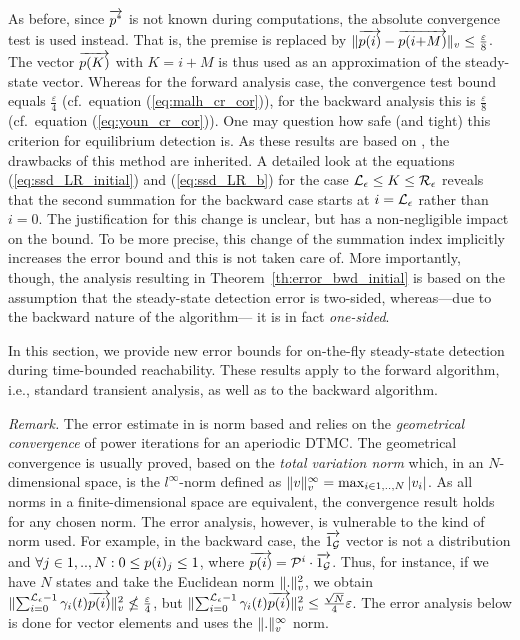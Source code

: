 \documentclass[times, 10pt,twocolumn]{article}
\begin{document}
		As before, since $\overrightarrow{p^{*}}$ is not known during computations, the absolute convergence test is used instead. That is, the premise is replaced by  $\lVert \overrightarrow{p(i)} - \overrightarrow{p(i{+}M)} \rVert_{v} \leq \frac{\varepsilon}{8}$.
		The vector $\overrightarrow{p(K)}$ with $K=i{+}M$ is thus used as an approximation of the steady-state vector. Whereas for the forward analysis case, the convergence test bound equals $\frac{\varepsilon}{4}$ (cf.\ equation (\ref{eq:malh_cr_cor})), for the backward analysis this is $\frac{\varepsilon}{8}$  (cf.\ equation (\ref{eq:youn_cr_cor})).  One may question how safe (and tight) this criterion for equilibrium detection is.  As these results are based on \cite{MalhotraMT_MR94}, the drawbacks of this method are inherited.  A detailed look at the equations (\ref{eq:ssd_LR_initial}) and (\ref{eq:ssd_LR_b}) for the case $\mathcal{L}_{\epsilon} \leq K \leq \mathcal{R}_{\epsilon}$ reveals that the second summation for the backward case starts at $i=\mathcal{L}_{\epsilon}$ rather than $i=0$.  The justification for this change is unclear, but has a non-negligible impact on the bound. To be more precise, this change of the summation index implicitly increases the error bound and this is not taken care of. More importantly, though,  the analysis resulting in Theorem~\ref{th:error_bwd_initial} is based on the assumption that the steady-state detection error is two-sided, whereas---due to the backward nature of the algorithm--- it is in fact \emph{one-sided}.

{}

	In this section, we provide new error bounds for on-the-fly steady-state detection during time-bounded reachability.  These results apply to the forward algorithm, i.e., standard transient analysis, as well as to the backward algorithm. %

	\emph{Remark.} The error estimate in \cite{MalhotraMT_MR94} is norm based and relies on the \emph{geometrical convergence} of power iterations for an aperiodic DTMC. The geometrical convergence is usually proved, based on the \emph{total variation norm} which, in an $N$-dimensional space, is the $l^{\infty}$-norm defined as $\lVert  v  \rVert_{v}^{\infty} = \max_{i \in 1,..,N} |v_{i}|$. As all norms in a finite-dimensional space are equivalent, the convergence result holds for any chosen norm.  The error analysis, however, is vulnerable to the kind of norm used.  For example, in the backward case, the $\overrightarrow{1_{\mathcal{G}}}$ vector is not a distribution and $\forall j \in 1,..,N: 0 \leq p(i)_{j} \leq 1$, where $\overrightarrow{p(i)}=\mathcal{P}^{i} \cdot \overrightarrow{1_{\mathcal{G}}}$. Thus, for instance, if we have $N$ states and take the Euclidean norm $\lVert  .  \rVert_{v}^{2}$, we obtain $\lVert  \sum_{i=0}^{\mathcal{L}_{\epsilon}-1} \gamma_{i}(t) \overrightarrow{p(i)}  \rVert_{v}^{2} \nleq \frac{\varepsilon}{4}$, but $\lVert  \sum_{i=0}^{\mathcal{L}_{\epsilon}-1} \gamma_{i}(t) \overrightarrow{p(i)}  \rVert_{v}^{2} \leq \frac{\sqrt{N}}{4}\varepsilon$.  The error analysis below is done for vector elements and uses the $\lVert  .  \rVert_{v}^{\infty}$ norm.
\end{document}
